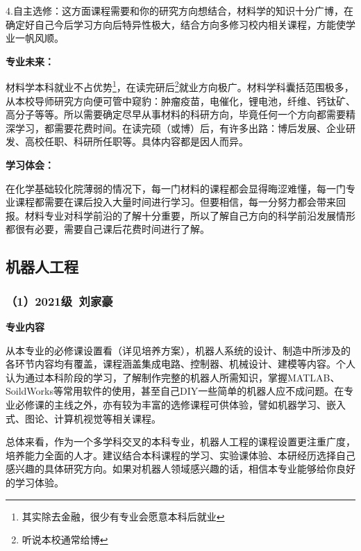 \documentclass[11pt,oneside]{book}
\begin{document}
\vspace{10pt}

4.自主选修：这方面课程需要和你的研究方向想结合，材料学的知识十分广博，在确定好自己今后学习方向后特异性极大，结合方向多修习校内相关课程，方能使学业一帆风顺。

\vspace{10pt}

\textbf{专业未来：}

材料学本科就业不占优势\footnote{其实除去金融，很少有专业会愿意本科后就业}，在读完研后\footnote{听说本校通常给博}就业方向极广。材料学科囊括范围极多，从本校导师研究方向便可管中窥豹：肿瘤疫苗，电催化，锂电池，纤维、钙钛矿、高分子等等。所以需要确定尽早从事材料的科研方向，毕竟任何一个方向都需要精深学习，都需要花费时间。在读完硕（或博）后，有许多出路：博后发展、企业研发、高校任职、科研所任职等。具体内容都是因人而异。

\vspace{10pt}

\textbf{学习体会：}

在化学基础较化院薄弱的情况下，每一门材料的课程都会显得晦涩难懂，每一门专业课程都需要在课后投入大量时间进行学习。但要相信，每一分努力都会带来回报。材料专业对科学前沿的了解十分重要，所以了解自己方向的科学前沿发展情形都很有必要，需要自己课后花费时间进行了解。

\subsection{机器人工程}
\subsubsection{（1）2021级\ 刘家豪}
\textbf{专业内容}

从本专业的必修课设置看（详见培养方案），机器人系统的设计、制造中所涉及的各环节内容均有覆盖，课程涵盖集成电路、控制器、机械设计、建模等内容。个人认为通过本科阶段的学习，了解制作完整的机器人所需知识，掌握MATLAB、SoildWorks等常用软件的使用，甚至自己DIY一些简单的机器人应不成问题。在专业必修课的主线之外，亦有较为丰富的选修课程可供体验，譬如机器学习、嵌入式、图论、计算机视觉等相关课程。

\vspace{10pt}

总体来看，作为一个多学科交叉的本科专业，机器人工程的课程设置更注重广度，培养能力全面的人才。建议结合本科课程的学习、实验课体验、本研经历选择自己感兴趣的具体研究方向。如果对机器人领域感兴趣的话，相信本专业能够给你良好的学习体验。

\vspace{10pt}
\end{document}
